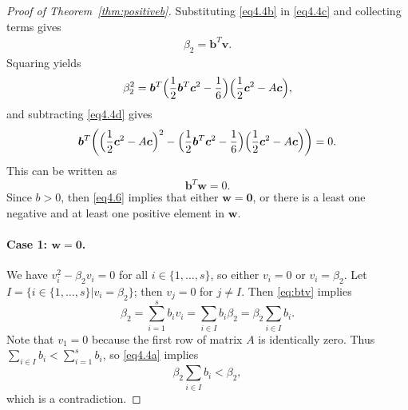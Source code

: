 \begin{proof}[Proof of Theorem~\ref{thm:positiveb}]
    Substituting \eqref{eq4.4b} in \eqref{eq4.4c} and collecting terms gives 
    \begin{align} \label{eq:btv}
        \beta_{2} = \bm{b}^{T}\bm{v}.
    \end{align}
    Squaring yields
    \begin{equation*}%
        \beta_{2}^{2} = \bm{b}^{T}\Bigl(\frac{1}{2}\bm{b}^{T}\bm{c}^{2} - \frac{1}{6}\Bigr)\Bigl(\frac{1}{2}\bm{c}^{2} - A\bm{c}\Bigr),
    \end{equation*}
    and subtracting \eqref{eq4.4d} gives
    \begin{equation*}
        \bm{b}^{T}\biggl(\Bigl(\frac{1}{2}\bm{c}^{2} - A\bm{c}\Bigr)^{2} - \Bigl(\frac{1}{2}\bm{b}^{T}\bm{c}^{2} - \frac{1}{6}\Bigr)\Bigl(\frac{1}{2}\bm{c}^{2} - A\bm{c}\Bigr)\biggr) = 0.
    \end{equation*}
    This can be written as
    \begin{equation}\label{eq4.6}
        \bm{b}^{T}\bm{w} = 0.
    \end{equation}
    Since $b>0$, then \eqref{eq4.6} implies that either \( \bm{w} = \bm{0} \),
    or there is a least one negative and at least one positive element in \( \bm{w} \).

\paragraph{Case 1: \( \bm{w} = \bm{0} \).}

We have \( v_{i}^{2} - \beta_{2}v_{i} = 0 \) for all \( i \in \{1,\dots,s\} \), so either \( v_{i} = 0 \) or \( v_{i} = \beta_{2} \).
Let \( I = \{ i \in\{1,\dots,s\} | v_{i} = \beta_{2} \} \); then \( v_{j} = 0 \) for \( j \neq I \). 
Then \eqref{eq:btv} implies 
$$ \beta_{2} = \sum_{i=1}^{s}b_{i}v_{i} = \sum_{i \in I}b_{i}\beta_{2} = \beta_{2}\sum_{i \in I}b_{i}.$$
Note that \( v_{1} = 0 \) because the first row of matrix \( A \) is identically zero. 
Thus $\sum_{i\in I}b_i < \sum_{i=1}^s b_i$, so \eqref{eq4.4a} implies
$$\beta_{2}\sum_{i \in I}b_{i}< \beta_{2},$$
which is a contradiction.


\end{proof}
